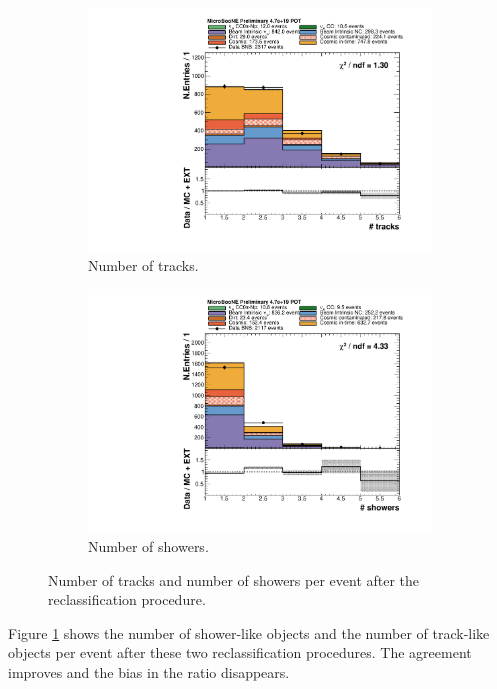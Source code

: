 \begin{figure}[htbp]
\centering
  \begin{subfigure}{0.45\textwidth}
    \includegraphics[width=\linewidth]{figures/h_n_tracks.pdf}
    \caption{Number of tracks.} 
  \end{subfigure}
    \begin{subfigure}{0.45\textwidth}
    \includegraphics[width=\linewidth]{figures/h_n_showers.pdf}
    \caption{Number of showers.} 
  \end{subfigure}
  \caption{Number of tracks and number of showers per event after the reclassification procedure.}\label{fig:nshowers_after}
\end{figure}



Figure \ref{fig:nshowers_after} shows the number of shower-like objects and the number of track-like objects per event after these two reclassification procedures. The agreement improves and the bias in the ratio disappears. 


